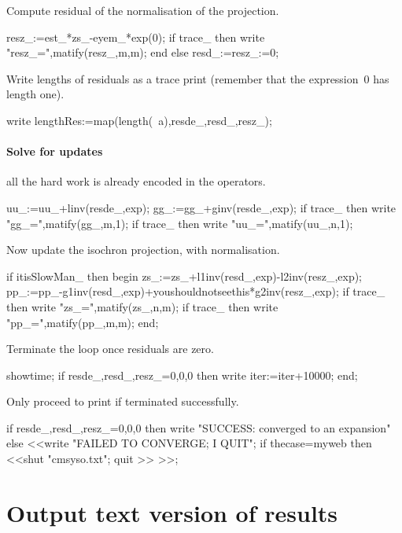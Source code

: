 \documentclass[11pt,a5paper]{article}
\begin{document}
Compute residual of the normalisation of the projection.
\begin{reduce}
    resz_:=est_*zs_-eyem_*exp(0);
if trace_ then write "resz_=",matify(resz_,m,m);
end else resd_:=resz_:=0; %
\end{reduce}

Write lengths of residuals as a trace print (remember that the expression~$0$ has length one).
\begin{reduce}
write lengthRes:=map(length(~a),{resde_,resd_,resz_});
\end{reduce}

\paragraph{Solve for updates}
all the hard work is already encoded in the operators.
\begin{reduce}
uu_:=uu_+linv(resde_,exp);
gg_:=gg_+ginv(resde_,exp);
if trace_ then write "gg_=",matify(gg_,m,1);
if trace_ then write "uu_=",matify(uu_,n,1);
\end{reduce}

Now update the isochron projection, with normalisation.
\begin{reduce}
if itisSlowMan_ then begin
zs_:=zs_+l1inv(resd_,exp)-l2inv(resz_,exp);
pp_:=pp_-g1inv(resd_,exp)+youshouldnotseethis*g2inv(resz_,exp);
if trace_ then write "zs_=",matify(zs_,n,m);
if trace_ then write "pp_=",matify(pp_,m,m);
end;
\end{reduce}


Terminate the loop once residuals are zero.

\begin{reduce}
showtime;
if {resde_,resd_,resz_}={0,0,0} then write iter:=iter+10000;
end;
\end{reduce}

Only proceed to print if terminated successfully.

\begin{reduce}
if {resde_,resd_,resz_}={0,0,0} 
  then write "SUCCESS: converged to an expansion"
  else <<write "FAILED TO CONVERGE; I QUIT";
    if thecase=myweb then <<shut "cmsyso.txt"; 
    quit >> >>;
\end{reduce}


\begin{reduce}
\end{reduce}


\section{Output text version of results}
\end{document}
